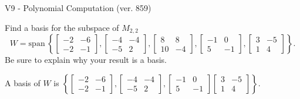 \begin{exercise}
  \begin{exerciseTitle}V9 - Polynomial Computation (ver. 859)\end{exerciseTitle}
  \begin{exerciseStatement}
    Find a basis for the subspace of \(M_{2,2}\) 
\[W=\mathrm{span}\ \left\{\left[\begin{array}{cc}
-2 & -6 \\
-2 & -1
\end{array}\right] , \left[\begin{array}{cc}
-4 & -4 \\
-5 & 2
\end{array}\right] , \left[\begin{array}{cc}
8 & 8 \\
10 & -4
\end{array}\right] , \left[\begin{array}{cc}
-1 & 0 \\
5 & -1
\end{array}\right] , \left[\begin{array}{cc}
3 & -5 \\
1 & 4
\end{array}\right]\right\}.\]
 Be sure to explain why your result is a basis.


  \end{exerciseStatement}
  \begin{exerciseAnswer}
   A basis of \(W\) is  \(\left\{\left[\begin{array}{cc}
-2 & -6 \\
-2 & -1
\end{array}\right] , \left[\begin{array}{cc}
-4 & -4 \\
-5 & 2
\end{array}\right] , \left[\begin{array}{cc}
-1 & 0 \\
5 & -1
\end{array}\right] \left[\begin{array}{cc}
3 & -5 \\
1 & 4
\end{array}\right]\right\}\).
  


  \end{exerciseAnswer}
\end{exercise}